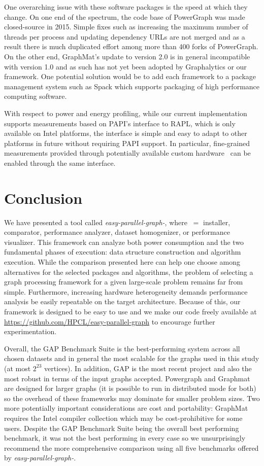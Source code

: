 \documentclass[conference]{IEEEtran}
\begin{document}
One overarching issue with these software packages is the speed at which they change. On one end of the spectrum, the code base of PowerGraph was made closed-source in 2015. Simple fixes such as increasing the maximum number of threads per process and updating dependency URLs are not merged and as a result there is much duplicated effort among more than 400 forks of PowerGraph. On the other end, GraphMat's update to version 2.0 is in general incompatible with version 1.0 and as such has not yet been adopted by Graphalytics or our framework. One potential solution would be to add each framework to a package management system such as Spack \cite{Gamblin:2015:Spack} which supports packaging of high performance computing software.

With respect to power and energy profiling, while our current implementation supports measurements based on PAPI's interface to RAPL, which is only available on Intel platforms, the interface is simple and easy to adapt to other platforms in future without requiring PAPI support. In particular, fine-grained measurements provided through potentially available custom hardware~\cite{naecon15} can be enabled through the same interface.

\section{Conclusion}
We have presented a tool called \emph{easy-parallel-graph\mbox{-\textasteriskcentered}}, where \textasteriskcentered $\ = $ installer, comparator, performance analyzer, dataset homogenizer, or performance visualizer. This framework can analyze both power consumption and the two fundamental phases of execution: data structure construction and algorithm execution. While the comparison presented here can help one choose among alternatives for the selected packages and algorithms, the problem of selecting a graph processing framework for a given large-scale problem remains far from simple. Furthermore, increasing hardware heterogeneity demands performance analysis be easily repeatable on the target architecture. Because of this, our framework is designed to be easy to use and we make our code freely available at \url{https://github.com/HPCL/easy-parallel-graph} to encourage further experimentation.

Overall, the GAP Benchmark Suite is the best-performing system across all chosen datasets and in general the most scalable for the graphs used in this study (at most $2^{23}$ vertices). In addition, GAP is the most recent project and also the most robust in terms of the input graphs accepted.  Powergraph and Graphmat are designed for larger graphs (it is possible to run in distributed mode for both) so the overhead of these frameworks may dominate for smaller problem sizes. Two more potentially important considerations are cost and portability: GraphMat requires the Intel compiler collection which may be cost-prohibitive for some users. Despite the GAP Benchmark Suite being the overall best performing benchmark, it was not the best performing in every case so we unsurprisingly recommend the more comprehensive comparison using all five benchmarks offered by \emph{easy-parallel-\mbox{graph-\textasteriskcentered}}.



\end{document}
